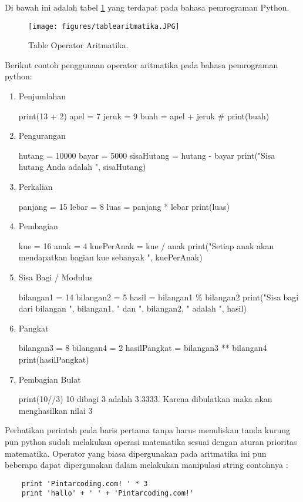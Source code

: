 Di bawah ini adalah tabel \ref{tablearitmatika} yang terdapat pada bahasa pemrograman Python.
\begin{figure}[ht]
	\centerline{\texttt{[image: figures/tablearitmatika.JPG]}}
	\caption{Table Operator Aritmatika.}
	\label{tablearitmatika}
\end{figure}

Berikut contoh penggunaan operator aritmatika pada bahasa pemrograman python:
\begin{enumerate}

\item Penjumlahan
	
	print(13 + 2)
	apel = 7
	jeruk = 9
	buah = apel + jeruk #
	print(buah)

\item Pengurangan

	hutang = 10000
	bayar = 5000
	sisaHutang = hutang - bayar
	print("Sisa hutang Anda adalah ", sisaHutang)
	
\item Perkalian

	panjang = 15
	lebar = 8
	luas = panjang * lebar
	print(luas)
	
\item Pembagian

	kue = 16
	anak = 4
	kuePerAnak = kue / anak
	print("Setiap anak akan mendapatkan bagian kue sebanyak ", kuePerAnak)
	
\item Sisa Bagi / Modulus

	bilangan1 = 14
	bilangan2 = 5
	hasil = bilangan1 \% bilangan2
	print("Sisa bagi dari bilangan ", bilangan1, " dan ", bilangan2, " adalah ", hasil)
	
\item Pangkat

	bilangan3 = 8
	bilangan4 = 2
	hasilPangkat = bilangan3 ** bilangan4
	print(hasilPangkat)
	
\item Pembagian Bulat

	print(10//3) 
	10 dibagi 3 adalah 3.3333. Karena dibulatkan maka akan menghasilkan nilai 3
	
\end{enumerate}

Perhatikan perintah pada baris pertama tanpa harus menuliskan tanda kurung pun python sudah melakukan operasi matematika sesuai dengan aturan prioritas matematika. Operator yang biasa dipergunakan pada aritmatika ini pun beberapa dapat dipergunakan dalam melakukan manipulasi string contohnya :
\begin{verbatim}
	print 'Pintarcoding.com! ' * 3
	print 'hallo' + ' ' + 'Pintarcoding.com!'
\end{verbatim}

